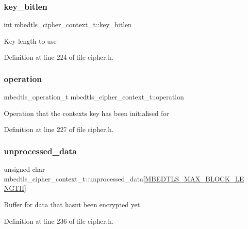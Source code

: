 \subsubsection{\texorpdfstring{key\+\_\+bitlen}{key\_bitlen}}
{\footnotesize\ttfamily int mbedtls\+\_\+cipher\+\_\+context\+\_\+t\+::key\+\_\+bitlen}

Key length to use 

Definition at line 224 of file cipher.\+h.

\mbox{\label{structmbedtls__cipher__context__t_a0075f60f220daa87578223a2022ba405}} 
\subsubsection{\texorpdfstring{operation}{operation}}
{\footnotesize\ttfamily mbedtls\+\_\+operation\+\_\+t mbedtls\+\_\+cipher\+\_\+context\+\_\+t\+::operation}

Operation that the context\textquotesingle{}s key has been initialised for 

Definition at line 227 of file cipher.\+h.

\mbox{\label{structmbedtls__cipher__context__t_a3fc86dfa20e0131377692ee07fb5b8f0}} 
\subsubsection{\texorpdfstring{unprocessed\+\_\+data}{unprocessed\_data}}
{\footnotesize\ttfamily unsigned char mbedtls\+\_\+cipher\+\_\+context\+\_\+t\+::unprocessed\+\_\+data\mbox{[}\mbox{\hyperlink{cipher_8h_ab8f30dc90403204515f868c3b6196ffd}{M\+B\+E\+D\+T\+L\+S\+\_\+\+M\+A\+X\+\_\+\+B\+L\+O\+C\+K\+\_\+\+L\+E\+N\+G\+TH}}\mbox{]}}

Buffer for data that hasn\textquotesingle{}t been encrypted yet 

Definition at line 236 of file cipher.\+h.

